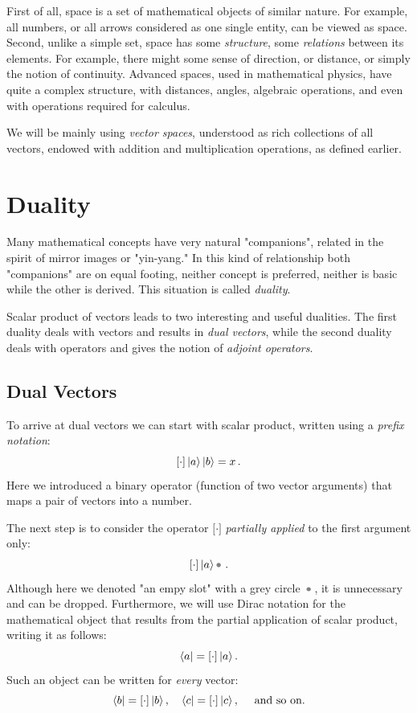 First of all, space is a set of mathematical objects of similar nature. For example, all numbers, or all arrows considered as one single entity, can be viewed as space. Second, unlike a simple set, space has some \emph{structure}, some \emph{relations} between its elements. For example, there might some sense of direction, or distance, or simply the notion of continuity. Advanced spaces, used in mathematical physics, have quite a complex structure, with distances, angles, algebraic operations, and even with operations required for calculus.

We will be mainly using \emph{vector spaces}, understood as rich collections of all vectors, endowed with addition and multiplication operations, as defined earlier.

\section{Duality}
Many mathematical concepts have very natural "companions", related in the spirit of mirror images or "yin-yang." In this kind of relationship both "companions" are on equal footing, neither concept is preferred, neither is basic while the other is derived. This situation is called \emph{duality}.

Scalar product of vectors leads to two interesting and useful dualities. The first duality deals with vectors and results in \emph{dual vectors}, while the second duality deals with operators and gives the notion of \emph{adjoint operators}.

\subsection{Dual Vectors}
To arrive at dual vectors we can start with scalar product, written using a \emph{prefix notation}:
\[
\lbrack\cdot\rbrack\,|{a}\rangle\,|{b}\rangle = x\,.
\]
Here we introduced a binary operator (function of two vector arguments) that maps a pair of vectors into a number.

The next step is to consider the operator $\lbrack\cdot\rbrack$ \emph{partially applied} to the first argument only:
\[
\lbrack\cdot\rbrack\,\ket{a}\tus\,.
\]
Although here we denoted "an empy slot" with a grey circle $\tus$, it is unnecessary and can be dropped. Furthermore, we will use Dirac notation for the mathematical object that results from the partial application of scalar product, writing it as follows:
\[
\langle{a}| = \lbrack\cdot\rbrack\,|{a}\rangle\,.
\]
Such an object can be written for \emph{every} vector:
\[
\langle{b}| = \lbrack\cdot\rbrack\,|{b}\rangle\,,\quad
\langle{c}| = \lbrack\cdot\rbrack\,|{c}\rangle\,,\quad\textrm{ and so on.}
\]

